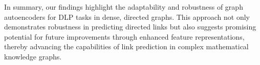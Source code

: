In summary, our findings highlight the adaptability and robustness of graph autoencoders for DLP
tasks in dense, directed graphs. This approach not only demonstrates robustness in predicting directed
links but also suggests promising potential for future improvements through enhanced feature
representations, thereby advancing the capabilities of link prediction in complex mathematical
knowledge graphs.
